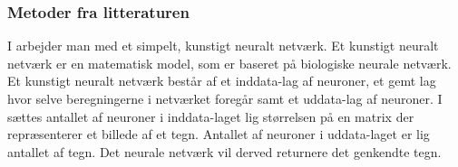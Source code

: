 
\subsubsection*{Metoder fra litteraturen}

I \cite{kwas} arbejder man med et simpelt, kunstigt neuralt netværk. Et kunstigt neuralt netværk er en matematisk model, som er baseret på biologiske neurale netværk. Et kunstigt neuralt netværk består af et inddata-lag af neuroner, et gemt lag hvor selve beregningerne i netværket foregår samt et uddata-lag af neuroner. I \cite{kwas} sættes antallet af neuroner i inddata-laget lig størrelsen på en matrix der repræsenterer et billede af et tegn. Antallet af neuroner i uddata-laget er lig antallet af tegn. Det neurale netværk vil derved returnere det genkendte tegn.